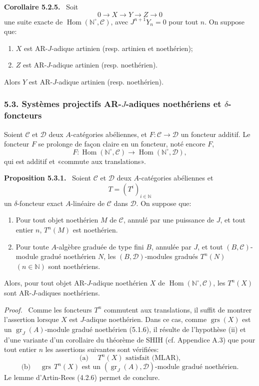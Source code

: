 \documentclass[11pt]{article}
\newenvironment{statement}[1]{\par\medskip\noindent\textbf{#1.}\ }{\par\medskip}
\newenvironment{prooftext}[1][Proof]{\par\noindent\emph{#1.}\ }{\par\medskip}
\DeclareMathOperator{\Hom}{Hom}
\providecommand{\gr}{\operatorname{gr}}
\providecommand{\Hom}{\operatorname{Hom}}
\providecommand{\gr}{\operatorname{gr}}
\providecommand{\gr}{\operatorname{gr}}
\providecommand{\grs}{\operatorname{grs}}
\begin{document}
\begin{statement}{Corollaire 5.2.5}
Soit
\[
0\longrightarrow X\longrightarrow Y\longrightarrow Z\longrightarrow0
\]
une suite exacte de \(\Hom(\mathbb N^\circ,\mathcal C)\), avec \(J^{n+1}Y_n=0\) pour tout \(n\). On suppose que:
\begin{enumerate}[label=\textup{(\roman*)}]
\item \(X\) est AR-\(J\)-adique artinien (resp. artinien et noethérien);
\item \(Z\) est AR-\(J\)-adique artinien (resp. noethérien).
\end{enumerate}
Alors \(Y\) est AR-\(J\)-adique artinien (resp. noethérien).
\end{statement}

\subsubsection*{5.3. Systèmes projectifs AR-\(J\)-adiques noethériens et \(\delta\)-foncteurs}

Soient \(\mathcal C\) et \(\mathcal D\) deux \(A\)-catégories abéliennes, et \(F:\mathcal C\to\mathcal D\) un foncteur additif. Le foncteur \(F\) se prolonge de façon claire en un foncteur, noté encore \(F\),
\[
F:\Hom(\mathbb N^\circ,\mathcal C)\longrightarrow\Hom(\mathbb N^\circ,\mathcal D),
\]
qui est additif et «commute aux translations».

\begin{statement}{Proposition 5.3.1}
Soient \(\mathcal C\) et \(\mathcal D\) deux \(A\)-catégories abéliennes et
\[
T=(T^i)_{i\in\mathbb N}
\]
un \(\delta\)-foncteur exact \(A\)-linéaire de \(\mathcal C\) dans \(\mathcal D\). On suppose que:
\begin{enumerate}[label=\textup{(\roman*)}]
\item Pour tout objet noethérien \(M\) de \(\mathcal C\), annulé par une puissance de \(J\), et tout entier \(n\), \(T^n(M)\) est noethérien.
\item Pour toute \(A\)-algèbre graduée de type fini \(B\), annulée par \(J\), et tout \((B,\mathcal C)\)-module gradué noethérien \(N\), les \((B,\mathcal D)\)-modules gradués \(T^n(N)\) \((n\in\mathbb N)\) sont noethériens.
\end{enumerate}
Alors, pour tout objet AR-\(J\)-adique noethérien \(X\) de \(\Hom(\mathbb N^\circ,\mathcal C)\), les \(T^n(X)\) sont AR-\(J\)-adiques noethériens.
\end{statement}

\begin{prooftext}
Comme les foncteurs \(T^n\) commutent aux translations, il suffit de montrer l'assertion lorsque \(X\) est \(J\)-adique noethérien. Dans ce cas, comme \(\grs(X)\) est un \(\gr_J(A)\)-module gradué noethérien (5.1.6), il résulte de l'hypothèse (ii) et d'une variante d'un corollaire du théorème de SHIH (cf. Appendice A.3) que pour tout entier \(n\) les assertions suivantes sont vérifiées:
\[
\text{(a) }\quad T^n(X)\text{ satisfait (MLAR),}
\]
\[
\text{(b) }\quad \grs\,T^n(X)\text{ est un }(\gr_J(A),\mathcal D)\text{-module gradué noethérien.}
\]
Le lemme d'Artin-Rees (4.2.6) permet de conclure.
\end{prooftext}
\end{document}
